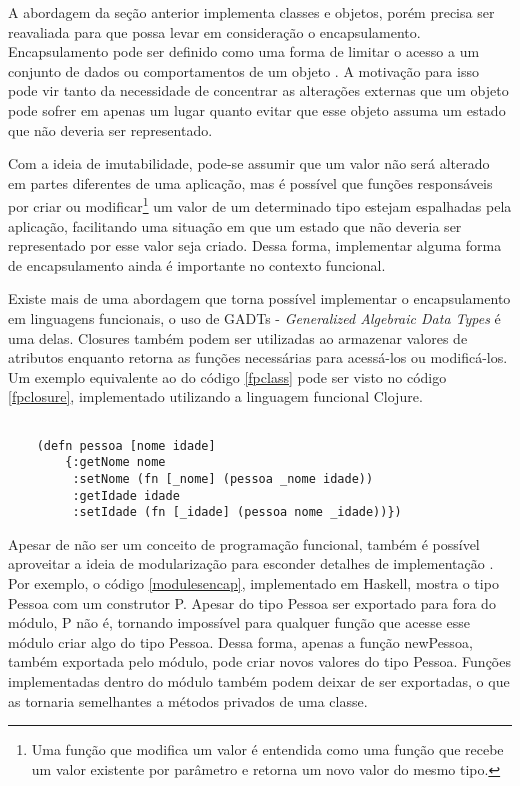 A abordagem da seção anterior implementa 
classes e objetos, porém precisa ser 
reavaliada para que possa levar em consideração 
o encapsulamento. Encapsulamento pode ser definido 
como uma forma de limitar o acesso a um conjunto 
de dados ou comportamentos de um objeto \cite{quarkoo}. 
A motivação para isso pode vir tanto da necessidade 
de concentrar as alterações externas que um objeto 
pode sofrer em apenas um lugar quanto evitar que 
esse objeto assuma um estado que não deveria ser 
representado. 

Com a ideia de imutabilidade, pode-se 
assumir que um valor não será alterado em partes 
diferentes de uma aplicação, mas é possível 
que funções responsáveis por criar ou modificar\footnote{
    Uma função que modifica um valor é entendida 
    como uma função que recebe um valor existente 
    por parâmetro e retorna um novo valor do mesmo 
    tipo.
} 
um valor de um determinado tipo estejam 
espalhadas pela aplicação, facilitando uma 
situação em que um estado que não deveria ser 
representado por esse valor seja criado. 
Dessa forma, implementar alguma forma de 
encapsulamento ainda é importante no 
contexto funcional.

Existe mais de uma abordagem que torna 
possível implementar o encapsulamento em 
linguagens funcionais, o uso de GADTs - 
\textit{Generalized Algebraic 
Data Types}\cite{existentialhaskell} é uma 
delas. Closures também podem 
ser utilizadas ao armazenar valores de 
atributos enquanto retorna as funções 
necessárias para acessá-los ou modificá-los. 
Um exemplo equivalente ao do código \ref{fpclass} 
pode ser visto no código \ref{fpclosure}, 
implementado utilizando a linguagem funcional Clojure. 
\cite{classlessjs}

\begin{lstlisting}[caption={Representação de uma classe com closures},label=fpclosure]
    
    (defn pessoa [nome idade]
        {:getNome nome
         :setNome (fn [_nome] (pessoa _nome idade))
         :getIdade idade
         :setIdade (fn [_idade] (pessoa nome _idade))})

\end{lstlisting}

Apesar de não ser um conceito de programação 
funcional, também é possível aproveitar a ideia 
de modularização para esconder detalhes de 
implementação \cite{mlmodules}. Por exemplo, o 
código \ref{modulesencap}, implementado em 
Haskell, mostra o tipo Pessoa com um construtor 
P. Apesar do tipo Pessoa ser exportado para fora do 
módulo, P não é, tornando impossível para qualquer 
função que acesse esse módulo criar algo do tipo 
Pessoa. Dessa forma, apenas a função newPessoa, 
também exportada pelo módulo, 
pode criar novos valores do tipo 
Pessoa. Funções implementadas dentro do módulo 
também podem deixar de ser exportadas, o que 
as tornaria semelhantes a métodos privados 
de uma classe.

